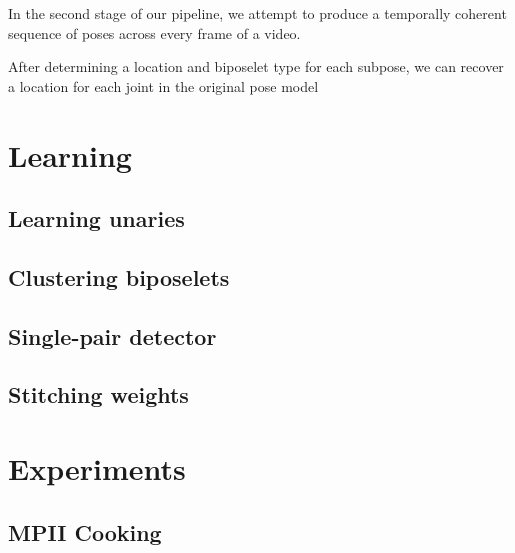 \documentclass[runningheads]{llncs}
\begin{document}
In the second stage of our pipeline, we attempt to produce a temporally coherent
sequence of poses across every frame of a video.%

After determining a location and biposelet type for each subpose, we can recover
a location for each joint in the original pose model%

\section{Learning}


\subsection{Learning unaries}

\subsection{Clustering biposelets}

\subsection{Single-pair detector}

\subsection{Stitching weights}

\section{Experiments}


\subsection{MPII Cooking}

\end{document}
